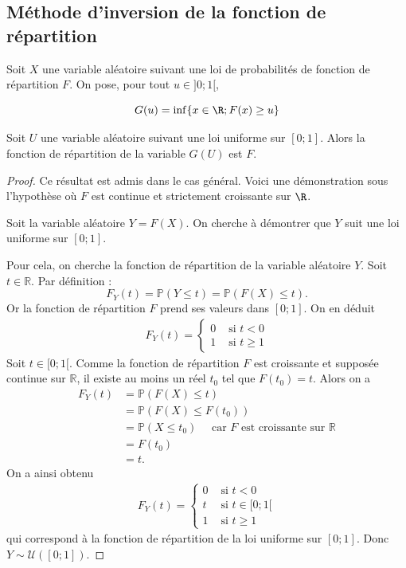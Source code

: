 \subsection{Méthode d'inversion de la fonction de répartition}
\begin{theoreme}{}{}
	Soit $X$ une variable aléatoire suivant une loi de probabilités de fonction de répartition $F$. On pose, pour tout $u \in]0;1[$,
	
	$$G(u)=\inf \{x\in \R ; F(x)\geq u \}$$
	
	Soit $U$ une variable aléatoire suivant une loi uniforme sur $[0;1]$. Alors la fonction de répartition de la variable $G(U)$ est $F$.
\end{theoreme}
\begin{proof}
	Ce résultat est admis dans le cas général. Voici une démonstration sous l'hypothèse où $F$ est continue et strictement croissante sur $\R$. 
	
	 Soit la variable aléatoire $Y=F(X)$. On cherche à démontrer que $Y$ suit une loi uniforme sur $[0;1]$. 

Pour cela, on cherche la fonction de répartition de la variable aléatoire $Y$. Soit $t\in\mathbb{R}$. Par définition :
\[ F_Y(t)=\mathbb{P}(Y\leq t)
=\mathbb{P}(F(X)\leq t).
\]
Or la fonction de répartition $F$ prend ses valeurs dans $[0;1]$. On en déduit
\begin{align*}
F_Y(t)=\begin{cases}
0 & \text{ si } t< 0 \\
1 & \text{ si } t\geq 1
\end{cases}
\end{align*}
Soit $t\in[0;1[$. Comme la fonction de répartition $F$ est croissante et supposée continue sur $\mathbb{R}$, il existe au moins un réel $t_0$ tel que $F(t_0)=t$. Alors on a
\begin{align*}
F_Y(t)&=\mathbb{P}(F(X)\leq t) \\
&=\mathbb{P}(F(X)\leq F(t_0)) \\
&=\mathbb{P}(X\leq t_0) \quad \text{ car $F$ est croissante sur $\mathbb{R}$} \\
&=F(t_0) \\
&=t.
\end{align*}
On a ainsi obtenu 
\begin{align*}
F_Y(t)=\begin{cases}
0 & \text{ si } t< 0 \\
t & \text{ si } t\in[0;1[ \\
1 & \text{ si } t\geq 1
\end{cases}
\end{align*}
qui correspond à la fonction de répartition de la loi uniforme sur $[0;1]$. Donc $Y\sim \mathcal{U}([0;1])$.
\end{proof}

